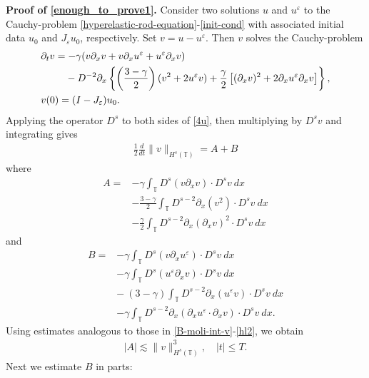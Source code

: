 \documentclass[12pt,reqno]{amsart}
\newcommand{\p}{\partial}
\newcommand{\ci}{\mathbb{T}}
\newcommand{\ee}{\varepsilon}
\theoremstyle{plain}  %
\theoremstyle{definition}
\begin{document}
{\bf Proof of \eqref{enough_to_prove1}.}
Consider two solutions $u $ and $u^\ee$ to the Cauchy-problem
\eqref{hyperelastic-rod-equation}-\eqref{init-cond}
with associated initial data $u_0$ and
$J_\ee u_0$, respectively. Set $v= u -u^\ee $. Then $v$ solves the
Cauchy-problem
\begin{align}
\label{4u}
& \p_t v  =  - \gamma (v \p_x v + v \p_x u^\ee + u^\ee \p_x v)  \\
& \phantom{ \p_t v  =} - D^{-2} \p_x \left\{ \left (\frac{3-\gamma}{2} \right )(v^2 +
2u^\ee v) + \frac{\gamma}{2}\left[ (\p_x v)^2 + 2 \p_x u^\ee \p_x v \right]
\right\}, \notag
\\
& v(0) = (I- J_\ee)u_0.
\label{5u}
\end{align}
Applying the operator $D^s$ to both sides of \eqref{4u}, then multiplying by
$D^s v$ and integrating gives
%
%
\begin{equation}
\begin{split}
\frac{1}{2}\frac{d}{dt} \|v\|_{H^s(\ci)} = A + B
\label{6u}
\end{split}
\end{equation}
%
%
where
%
%
\begin{equation}
\begin{split}
A
 =  & -\gamma \int_{\ci} D^s(v \p_x v) \cdot D^s v \
dx
\\
& - \frac{3- \gamma}{2} \int_\ci D^{s-2} \p_x (v^2) \cdot D^s v
\ dx
\\
& - \frac{\gamma}{2}\int_\ci D^{s-2} \p_x (\p_x v)^2 \cdot D^s
v \ dx
\label{7u}
\end{split}
\end{equation}
%
%
and
%
%
\begin{equation}
\begin{split}
B = & -\gamma \int_\ci D^s (v \p_x u^\ee ) \cdot D^s v \
dx \\
& -\gamma \int_\ci D^s (u^\ee \p_x v) \cdot D^s v \
dx
\\
& - \ ( 3- \gamma) \int_\ci D^{s-2} \p_x (u^\ee v) \cdot D^s
v \ dx
\\
& -\gamma \int_\ci D^{s-2} \p_x
(\p_x u^\ee \cdot \p_x v) \cdot D^s v \
dx.
\label{8u}
\end{split}
\end{equation}
%
%
Using estimates analogous to those in 
\eqref{B-moli-int-v}-\eqref{hl2}, we 
obtain 
%
%
\begin{equation}
\begin{split}
|A| \lesssim \|v\|_{H^s(\ci)}^3, \quad |t| \le T.
\label{8'u}
\end{split}
\end{equation}
%
%
%
Next we estimate $B$ in parts:
%
%
%
%
%
\end{document}
